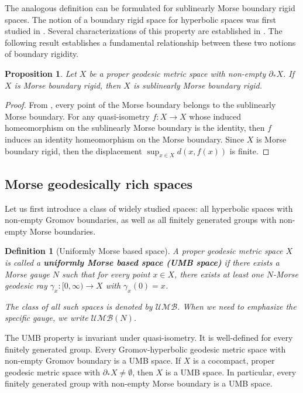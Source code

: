 \documentclass[a4paper,11pt,oneside]{article}
\newtheorem{Definition}[Theorem]{Definition}
\newtheorem{Proposition}[Theorem]{Proposition}
\newcommand{\UMBspace}{\ensuremath{\mathcal{UMB}}}  %
\newcommand{\UMBclass}[1][N]{\ensuremath{\mathcal{UMB}(#1)}} %
\begin{document}
The analogous definition can be formulated for sublinearly Morse boundary rigid spaces. The notion of a boundary rigid space for hyperbolic spaces was first studied in \cite{Shchur13, LiangZhou24}. Several characterizations of this property are established in \cite{LiangZhou24}.
The following result establishes a fundamental relationship between these two notions of boundary rigidity.

\begin{Proposition}
    Let $X$ be a proper geodesic metric space with non-empty $\partial_*X$. If $X$ is Morse boundary rigid, then $X$ is sublinearly Morse boundary rigid.
\end{Proposition}

\begin{proof}
From \cite{qing22, qing24}, every point of the Morse boundary belongs to the sublinearly Morse boundary. For any quasi-isometry $f: X\to X$ whose induced homeomorphism on the sublinearly Morse boundary is the identity, then $f$ induces an identity homeomorphism on the Morse boundary. Since $X$ is Morse boundary rigid, then the displacement  $\sup_{x\in X} d(x,f(x))$ is finite. 
\end{proof}

\subsection{Morse geodesically rich spaces}
 Let us first introduce a class of widely studied spaces: all hyperbolic spaces with non-empty Gromov boundaries, as well as all finitely generated groups with non-empty Morse boundaries. 

\begin{Definition}[Uniformly Morse based space]\label{def:UMB}
A proper geodesic metric space \(X\) is called a \textbf{uniformly Morse based space (UMB space)} if there exists a Morse gauge \(N \)  such that for every point \(x \in X\), there exists at least one $N$-Morse geodesic ray \(\gamma_x \colon [0,\infty) \to X\) with \(\gamma_x(0) = x\).

The class of all such spaces is denoted by \(\UMBspace\). When we need to emphasize the specific gauge, we write \(\UMBclass[N]\).
\end{Definition}

The UMB property is invariant under quasi-isometry. It is well-defined for every finitely generated group. Every Gromov-hyperbolic geodesic metric space with non-empty Gromov boundary is a UMB space. 
If $X$ is a cocompact, proper geodesic metric space with $\partial_*X\neq\emptyset$, then $X$ is a UMB space. In particular, every finitely generated group with non-empty Morse boundary is a UMB space.
\end{document}
